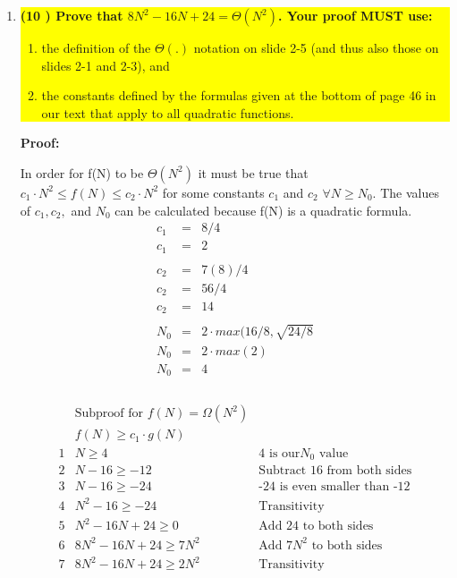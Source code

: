 \documentclass[12pt]{article}
\newcommand{\pbStatement}[2]{
  \colorbox{yellow}{\parbox[t]{0.93\textwidth}
        {\bf (#1 \ifthenelse{#1 > 1}{points}{point})
 #2}}}
\begin{document}
\begin{enumerate}
   \item                            %
     \pbStatement{10}{Prove that $8N^2 - 16N + 24 = \Theta(N^2)$. Your proof
     MUST use:
     \begin{enumerate}
       \item the definition of the $\Theta(.)$ notation on slide 2-5 (and
       thus also those on slides 2-1 and 2-3), and
       \item the constants defined by the formulas given at the bottom of
         page 46 in our text that apply to all quadratic functions.
     \end{enumerate}
   }

   {\bf Proof:}

        In order for f(N) to be $\Theta (N^2)$ it must be true that $c_1 \cdot N^2 \leq f(N) \leq c_2\cdot N^2$ for some constants $c_1$ and $c_2$ $ \forall N \geq N_0$. The values of $c_1, c_2, $ and $N_0$ can be calculated because f(N) is a quadratic formula.
    \begin{eqnarray*}
        c_1 &=& 8/4 \\
        c_1 &=& 2 \\
        &&\\
        c_2 &=& 7(8)/4 \\
        c_2 &=& 56/4 \\
        c_2 &=& 14 \\
        &&\\
        N_0 &=& 2\cdot max(16/8, \sqrt{24/8} \\
        N_0 &=& 2\cdot max(2) \\
        N_0 &=& 4 \\
        & & \\
    \end{eqnarray*}
    
    \begin{eqnarray*}
          & \text{Subproof for } f(N) = \Omega(N^2) & \\
          & f(N) \geq c_1 \cdot g(N) & \\
        1 & N \geq 4 & \text{4 is our}  N_0  \text{ value} \\
        2 & N - 16 \geq -12 & \text{Subtract 16 from both sides} \\
        3 & N - 16 \geq -24 & \text{-24 is even smaller than -12} \\
        4 & N^2 - 16 \geq -24 & \text{Transitivity} \\
        5 & N^2 - 16N + 24 \geq 0 & \text{Add 24 to both sides} \\
        6 & 8N^2 -16N + 24 \geq 7N^2 & \text{Add $7N^2$ to both sides} \\
        7 & 8N^2 -16N +24 \geq 2N^2 & \text{Transitivity} \\
    \end{eqnarray*}
    

\end{enumerate}
\end{document}
